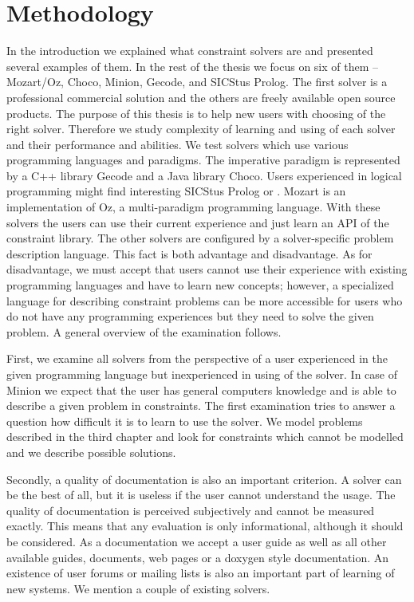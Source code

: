 \chapter{Methodology}

In the introduction we explained what constraint solvers are and presented several 
examples of them. In the rest of the thesis we focus on six of them -- Mozart/Oz, 
Choco, Minion, Gecode, \eclipse and SICStus Prolog. The first solver is a 
professional commercial solution and the others are freely available open source 
products. The purpose of this thesis is to help new users with choosing of the right solver. 
Therefore we study complexity of learning and using of each solver and their 
performance and abilities. We test solvers which use various programming languages 
and paradigms. The imperative paradigm is represented by a C++ library Gecode and a Java 
library Choco. Users experienced in logical programming might find interesting 
SICStus Prolog or \eclipse. Mozart is an implementation of Oz, a multi-paradigm 
programming language. With these solvers the users can use their current experience and 
just learn an API of the constraint library. The other solvers are configured by 
a solver-specific problem description language. This fact is both advantage and disadvantage. 
As for disadvantage, we must accept that users cannot use their experience with 
existing programming languages and have to learn new concepts; however, a specialized 
language for describing constraint problems can be more accessible for users who 
do not have any programming experiences but they need to solve the given problem.
A general overview of the examination follows.

First, we examine all solvers from the perspective of a user experienced in the given 
programming language but inexperienced in using of the solver. In case of Minion 
we expect that the user has general computers knowledge and is able 
to describe a given problem in constraints. The first examination tries to answer 
a question how difficult it is to learn to use the solver. We model problems 
described in the third chapter and look for constraints which cannot be modelled 
and we describe possible solutions. 

Secondly, a quality of documentation is also an important criterion. A solver can be 
the best of all, but it is useless if the user cannot understand the usage. 
The quality of documentation is perceived subjectively and cannot be measured 
exactly. This means that any evaluation is only informational, although it should be 
considered. As a documentation we accept a user guide as well as all other available 
guides, documents, web pages or a doxygen style documentation. An existence of user 
forums or mailing lists is also an important part of learning of new systems. We 
mention a couple of existing solvers. 

